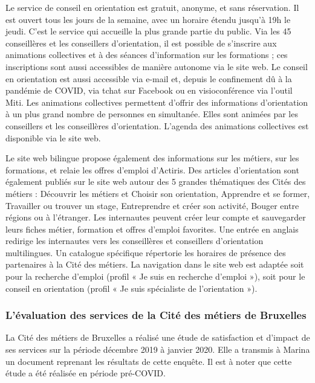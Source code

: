 \documentclass[french,a4paper,12pt]{article}
\begin{document}
\quad Le service de conseil en orientation est gratuit, anonyme, et sans réservation. Il est ouvert tous les jours de la semaine, avec un horaire étendu jusqu’à 19h le jeudi. C’est le service qui accueille la plus grande partie du public. Via les 45 conseillères et les conseillers d’orientation, il est possible de s’inscrire aux animations collectives et à des séances d’information sur les formations ; ces inscriptions sont aussi accessibles de manière autonome via le site web. Le conseil en orientation est aussi accessible via e-mail et, depuis le confinement dû à la pandémie de COVID, via tchat sur Facebook ou en visioconférence via l’outil Miti.
Les animations collectives permettent d’offrir des informations d’orientation à un plus grand nombre de personnes en simultanée. Elles sont animées par les conseillers et les conseillères d’orientation. L’agenda des animations collectives est disponible via le site web.

\quad Le site web bilingue propose également des informations sur les métiers, sur les formations, et relaie les offres d’emploi d’Actiris. Des articles d’orientation sont également publiés sur le site web autour des 5 grandes thématiques des Cités des métiers : Découvrir les métiers et Choisir son orientation, Apprendre et se former, Travailler ou trouver un stage, Entreprendre et créer son activité, Bouger entre régions ou à l’étranger. Les internautes peuvent créer leur compte et sauvegarder leurs fiches métier, formation et offres d’emploi favorites. Une entrée en anglais redirige les internautes vers les conseillères et conseillers d’orientation multilingues. Un catalogue spécifique répertorie les horaires de présence des partenaires à la Cité des métiers. La navigation dans le site web est adaptée soit pour la recherche d’emploi (profil « Je suis en recherche d’emploi »), soit pour le conseil en orientation (profil « Je suis spécialiste de l’orientation »).

\subsubsection{L’évaluation des services de la Cité des métiers de Bruxelles}

\quad La Cité des métiers de Bruxelles a réalisé une étude de satisfaction et d’impact de ses services sur la période décembre 2019 à janvier 2020. Elle a transmis à Marina un document reprenant les résultats de cette enquête. Il est à noter que cette étude a été réalisée en période pré-COVID.
\end{document}

